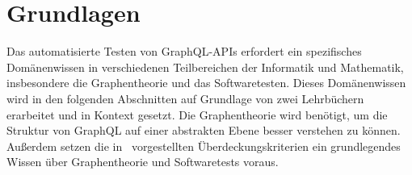\chapter{Grundlagen}
\label{theorie}

Das automatisierte Testen von GraphQL-APIs erfordert ein spezifisches Domänenwissen in verschiedenen Teilbereichen der
Informatik und Mathematik, insbesondere die Graphentheorie und das Softwaretesten.
Dieses Domänenwissen wird in den folgenden Abschnitten auf Grundlage von zwei Lehrbüchern~\cite{software-testing,graphentheorie} erarbeitet
und in Kontext gesetzt.
Die Graphentheorie wird benötigt, um die Struktur von GraphQL auf einer abstrakten Ebene besser verstehen zu können.
Außerdem setzen die in~\cite{software-testing} vorgestellten Überdeckungskriterien ein grundlegendes Wissen über Graphentheorie und Softwaretests voraus.